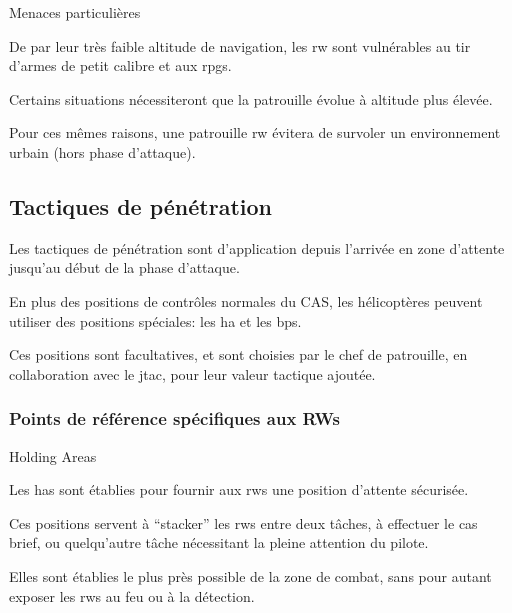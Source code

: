 	\item Menaces particulières

	\begin{e2}
	    \item De par leur très faible altitude de navigation, les \gls{rw} sont vulnérables au tir d'armes de petit calibre et aux \glspl{rpg}.
	    \item Certains situations nécessiteront que la patrouille évolue à altitude plus élevée.
	    \item Pour ces mêmes raisons, une patrouille \gls{rw} évitera de survoler un environnement urbain (hors phase d'attaque).
	\end{e2}

\ed

\subsection{Tactiques de pénétration}

\e
    \item Les tactiques de pénétration sont d'application depuis l'arrivée en zone d'attente jusqu'au début de la phase d'attaque.
    \item En plus des positions de contrôles normales du CAS, les hélicoptères peuvent utiliser des positions spéciales: les \gls{ha} et les \glspl{bp}.
    \item Ces positions sont facultatives, et sont choisies par le chef de patrouille, en collaboration avec le \gls{jtac}, pour leur valeur tactique ajoutée.
\ed

\subsubsection{Points de référence spécifiques aux RWs}

\e
	\item Holding Areas

	\ee
	    \item Les \glspl{ha} sont établies pour fournir aux \glspl{rw} une position d'attente sécurisée.
	    \item Ces positions servent à “stacker” les \glspl{rw} entre deux tâches, à effectuer le \gls{cas} brief, ou quelqu'autre tâche nécessitant la pleine attention du pilote.
	    \item Elles sont établies le plus près possible de la zone de combat, sans pour autant exposer les \glspl{rw} au feu ou à la détection.
	\ed


